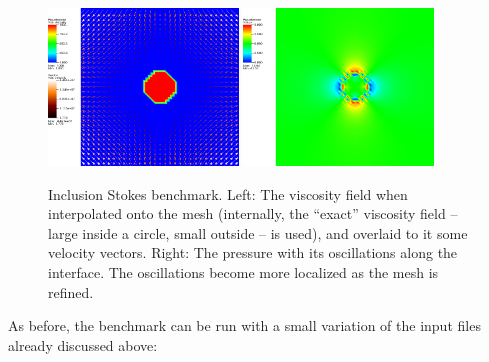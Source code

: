 \documentclass{article}
\begin{document}
\begin{figure}
  \begin{center}
    \includegraphics[width=0.45\textwidth]{cookbooks/benchmarks/inclusion-solution}
    \hfill
    \includegraphics[width=0.45\textwidth]{cookbooks/benchmarks/inclusion-solution-pressure}
    \caption{Inclusion Stokes benchmark. Left: The viscosity field
      when interpolated onto the mesh (internally, the ``exact'' viscosity
      field -- large inside a circle, small outside -- is used),
      and overlaid to it some velocity vectors. Right: The
      pressure with its oscillations along the interface. The oscillations
      become more localized as the mesh is refined.}
    \label{fig:inclusion}
  \end{center}
\end{figure}

As before, the benchmark can be run with a small variation of the input files
already discussed above:
\end{document}
